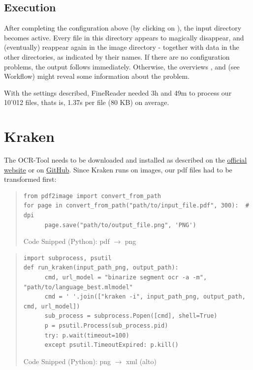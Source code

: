 \subsection{Execution}

After completing the configuration above (by clicking on ), the input directory becomes active. Every file in this directory appears to magically disappear, and (eventually) reappear again in the image directory - together with data in the other directories, as indicated by their names.
If there are no configuration problems, the output follows immediately.
Otherwise, the overviews ,  and  (see Workflow) might reveal some information about the problem.

\medskip

With the settings described, FineReader needed 3h and 49m to process our 10'012 files, thats is, 1.37s per file (80 KB) on average.

\section{Kraken}

The OCR-Tool  needs to be downloaded and installed as described on the \href{http://kraken.re/}{official website} or on \href{https://github.com/mittagessen/kraken}{GitHub}. Since Kraken runs on images, our pdf files had to be transformed first:

\begin{quote}
\begin{lstlisting}
from pdf2image import convert_from_path
for page in convert_from_path("path/to/input_file.pdf", 300):  # dpi
	  page.save("path/to/output_file.png", 'PNG')
\end{lstlisting}
\vspace{-1.cm}
\begin{center}
Code Snipped (Python): pdf $\rightarrow$ png
\end{center}
\end{quote}

\begin{quote}
\begin{lstlisting}
import subprocess, psutil
def run_kraken(input_path_png, output_path):
	  cmd, url_model = "binarize segment ocr -a -m", "path/to/language_best.mlmodel"
	  cmd = ' '.join(["kraken -i", input_path_png, output_path, cmd, url_model])
	  sub_process = subprocess.Popen([cmd], shell=True)
	  p = psutil.Process(sub_process.pid)
	  try: p.wait(timeout=100)
	  except psutil.TimeoutExpired: p.kill()
\end{lstlisting}
\vspace{-1.cm}
\begin{center}
Code Snipped (Python): png $\rightarrow$ xml (alto)
\end{center}
\end{quote}


